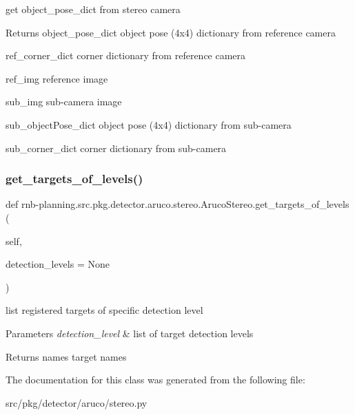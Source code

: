 get object\+\_\+pose\+\_\+dict from stereo camera 

\begin{DoxyReturn}{Returns}
object\+\_\+pose\+\_\+dict object pose (4x4) dictionary from reference camera 

ref\+\_\+corner\+\_\+dict corner dictionary from reference camera 

ref\+\_\+img reference image 

sub\+\_\+img sub-\/camera image 

sub\+\_\+object\+Pose\+\_\+dict object pose (4x4) dictionary from sub-\/camera 

sub\+\_\+corner\+\_\+dict corner dictionary from sub-\/camera 
\end{DoxyReturn}
\mbox{\label{classrnb-planning_1_1src_1_1pkg_1_1detector_1_1aruco_1_1stereo_1_1_aruco_stereo_a88d4104cd83e3d1fd82168a9bc449237}} 
\subsubsection{\texorpdfstring{get\+\_\+targets\+\_\+of\+\_\+levels()}{get\_targets\_of\_levels()}}
{\footnotesize\ttfamily def rnb-\/planning.\+src.\+pkg.\+detector.\+aruco.\+stereo.\+Aruco\+Stereo.\+get\+\_\+targets\+\_\+of\+\_\+levels (\begin{DoxyParamCaption}\item[{}]{self,  }\item[{}]{detection\+\_\+levels = {\ttfamily None} }\end{DoxyParamCaption})}



list registered targets of specific detection level 


\begin{DoxyParams}{Parameters}
{\em detection\+\_\+level} & list of target detection levels \\
\hline
\end{DoxyParams}
\begin{DoxyReturn}{Returns}
names target names 
\end{DoxyReturn}


The documentation for this class was generated from the following file\+:\begin{DoxyCompactItemize}
\item 
src/pkg/detector/aruco/stereo.\+py\end{DoxyCompactItemize}
